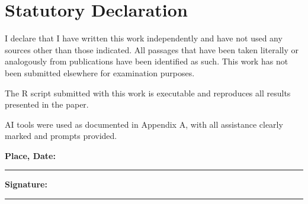 \documentclass[12pt,a4paper,oneside]{report}
\begin{document}
	\printbibliography
	
	
	
	\chapter*{Statutory Declaration}
	
	I declare that I have written this work independently and have not used any sources other than those indicated. All passages that have been taken literally or analogously from publications have been identified as such. This work has not been submitted elsewhere for examination purposes.
	
	The R script submitted with this work is executable and reproduces all results presented in the paper.
	
	AI tools were used as documented in Appendix A, with all assistance clearly marked and prompts provided.
	
	\vspace{2cm}
	
	\textbf{Place, Date:} \rule{5cm}{0.5pt}
	
	\vspace{1cm}
	
	\textbf{Signature:} \rule{5cm}{0.5pt}
	
\end{document}
